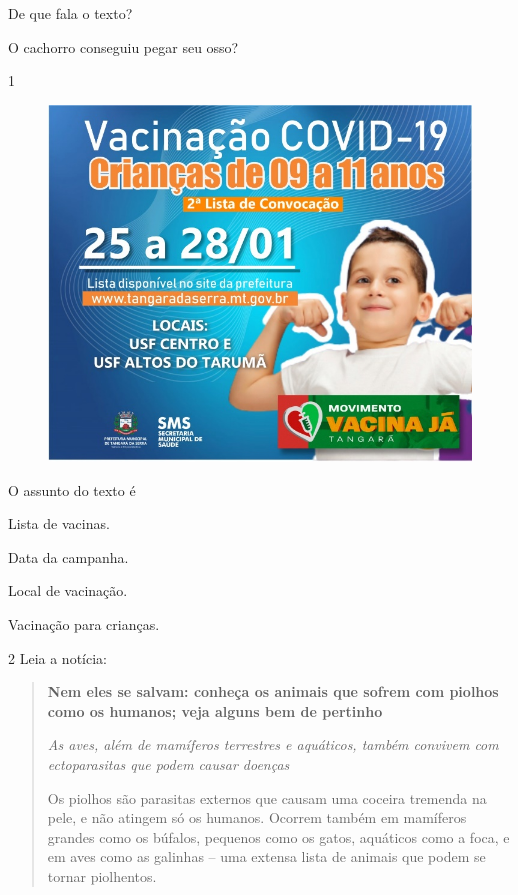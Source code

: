 \begin{escolha}
\item De que fala o texto?


\item O cachorro conseguiu pegar seu osso?

\end{escolha}

\pagebreak
{}

\num{1}

\begin{figure}[htpb!]
\centering
\includegraphics[width=.6\textwidth]{media/image124.jpeg}
\end{figure}


O assunto do texto é

\begin{escolha}
\item Lista de vacinas.

\item Data da campanha.

\item Local de vacinação.

\item Vacinação para crianças.
\end{escolha}

\num{2} Leia a notícia:

\begin{quote}
\textbf{Nem eles se salvam: conheça os animais que sofrem com piolhos
como os humanos; veja alguns bem de pertinho}

\textit{As aves, além de mamíferos terrestres e aquáticos, também convivem com
ectoparasitas que podem causar doenças}

Os piolhos são parasitas externos que causam uma coceira tremenda na
pele, e não atingem só os humanos. Ocorrem também em mamíferos grandes
como os búfalos, pequenos como os gatos, aquáticos como a foca, e em
aves como as galinhas -- uma extensa lista de animais que podem se
tornar piolhentos.

\end{quote}

